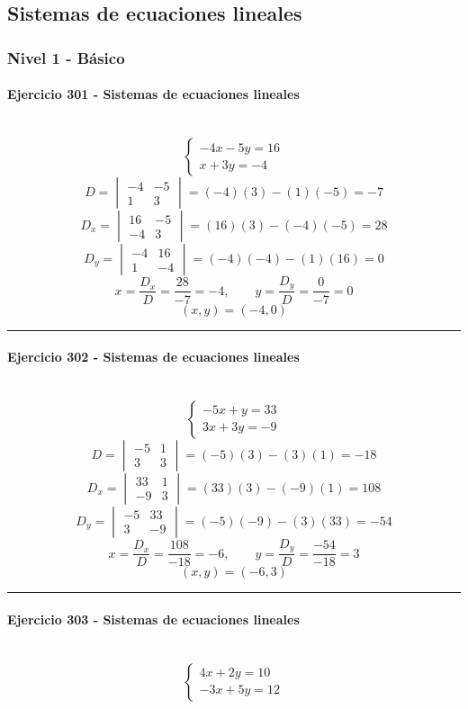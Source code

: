 \documentclass[10pt,a4paper]{article}
\newcommand{\res}[1]{\paragraph{#1}\mbox{}\\[-1.2em]}
\begin{document}
\subsection{Sistemas de ecuaciones lineales}
\subsubsection*{Nivel 1 - Básico}
\res{Ejercicio 301 - Sistemas de ecuaciones lineales}
\[ \begin{cases}- 4 x - 5 y=16\\x + 3 y=-4\end{cases} \]
\[ D=\begin{vmatrix}-4&-5\\1&3\end{vmatrix}=(-4)(3)-(1)(-5)=-7 \]
\[ D_x=\begin{vmatrix}16&-5\\-4&3\end{vmatrix}=(16)(3)-(-4)(-5)=28 \]
\[ D_y=\begin{vmatrix}-4&16\\1&-4\end{vmatrix}=(-4)(-4)-(1)(16)=0 \]
\[ x=\frac{D_x}{D}=\frac{28}{-7}=-4,\qquad y=\frac{D_y}{D}=\frac{0}{-7}=0 \]
\[ \boxed{(x,y)=(-4,0)} \]
\vspace{1mm}\hrule\vspace{2mm}
\res{Ejercicio 302 - Sistemas de ecuaciones lineales}
\[ \begin{cases}- 5 x + y=33\\3 x + 3 y=-9\end{cases} \]
\[ D=\begin{vmatrix}-5&1\\3&3\end{vmatrix}=(-5)(3)-(3)(1)=-18 \]
\[ D_x=\begin{vmatrix}33&1\\-9&3\end{vmatrix}=(33)(3)-(-9)(1)=108 \]
\[ D_y=\begin{vmatrix}-5&33\\3&-9\end{vmatrix}=(-5)(-9)-(3)(33)=-54 \]
\[ x=\frac{D_x}{D}=\frac{108}{-18}=-6,\qquad y=\frac{D_y}{D}=\frac{-54}{-18}=3 \]
\[ \boxed{(x,y)=(-6,3)} \]
\vspace{1mm}\hrule\vspace{2mm}
\res{Ejercicio 303 - Sistemas de ecuaciones lineales}
\[ \begin{cases}4 x + 2 y=10\\- 3 x + 5 y=12\end{cases} \]
\end{document}

